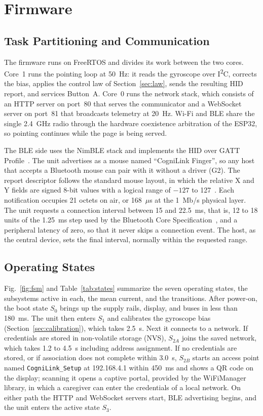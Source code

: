 \documentclass[journal]{IEEEtran}
\begin{document}
\section{Firmware}
\label{sec:firmware}

\subsection{Task Partitioning and Communication}
The firmware runs on FreeRTOS and divides its work between the two cores. Core~1 runs the pointing loop at 50~Hz: it reads the gyroscope over I\textsuperscript{2}C, corrects the bias, applies the control law of Section~\ref{sec:law}, sends the resulting HID report, and services Button~A. Core~0 runs the network stack, which consists of an HTTP server on port~80 that serves the communicator and a WebSocket server on port~81 that broadcasts telemetry at 20~Hz. Wi-Fi and BLE share the single 2.4~GHz radio through the hardware coexistence arbitration of the ESP32, so pointing continues while the page is being served.

The BLE side uses the NimBLE stack and implements the HID over GATT Profile~\cite{hogp}. The unit advertises as a mouse named ``CogniLink Finger'', so any host that accepts a Bluetooth mouse can pair with it without a driver (G2). The report descriptor follows the standard mouse layout, in which the relative X and Y fields are signed 8-bit values with a logical range of $-127$ to 127~\cite{usbhid}. Each notification occupies 21 octets on air, or 168~$\mu$s at the 1~Mb/s physical layer. The unit requests a connection interval between 15 and 22.5~ms, that is, 12 to 18 units of the 1.25~ms step used by the Bluetooth Core Specification~\cite{btcore62}, and a peripheral latency of zero, so that it never skips a connection event. The host, as the central device, sets the final interval, normally within the requested range.

\subsection{Operating States}
\label{sec:states}
Fig.~\ref{fig:fsm} and Table~\ref{tab:states} summarize the seven operating states, the subsystems active in each, the mean current, and the transitions. After power-on, the boot state $S_0$ brings up the supply rails, display, and buses in less than 180~ms. The unit then enters $S_1$ and calibrates the gyroscope bias (Section~\ref{sec:calibration}), which takes 2.5~s. Next it connects to a network. If credentials are stored in non-volatile storage (NVS), $S_{2A}$ joins the saved network, which takes 1.2 to 4.5~s including address assignment. If no credentials are stored, or if association does not complete within 3.0~s, $S_{2B}$ starts an access point named \texttt{CogniLink\_Setup} at 192.168.4.1 within 450~ms and shows a QR code on the display; scanning it opens a captive portal, provided by the WiFiManager library, in which a caregiver can enter the credentials of a local network. On either path the HTTP and WebSocket servers start, BLE advertising begins, and the unit enters the active state $S_3$.
\end{document}
